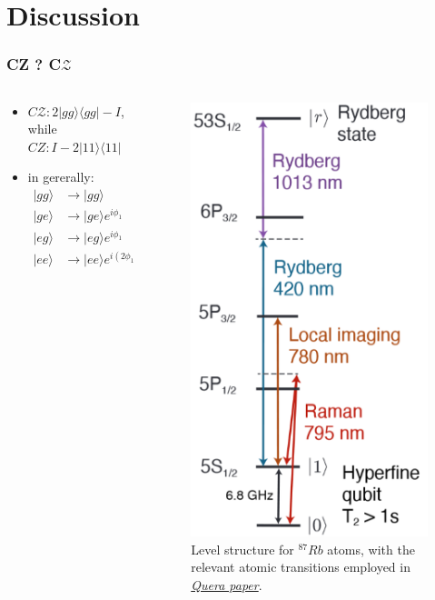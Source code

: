 \documentclass[18 pt]{beamer}
\begin{document}
\section{Discussion}
\begin{frame}
    \frametitle{CZ ? C$\mathcal{Z}$}
    \begin{columns}
        \begin{column}{.5\textwidth}
            \begin{itemize}
                \item $C\mathcal{Z}: 2|gg\rangle\langle gg| - I$, while $CZ: I - 2|11\rangle\langle 11|$
                \item in gererally:
                \begin{align*}
                    |gg\rangle & \rightarrow |gg\rangle \\
                    |ge\rangle & \rightarrow |ge\rangle e^{i\phi_1} \\
                    |eg\rangle & \rightarrow |eg\rangle e^{i\phi_1} \\
                    |ee\rangle & \rightarrow |ee\rangle e^{i(2\phi_1 + \pi)}
                \end{align*}
            \end{itemize}
        \end{column}
        \begin{column}{.5\textwidth}
            \begin{figure}
                \includegraphics[width=.5\textwidth]{level.png}
                \caption{Level structure for $^{87}Rb$ atoms, with the relevant atomic transitions employed in \href{http://arxiv.org/abs/2312.03982}{\textit{Quera paper}}.}
            \end{figure}
        \end{column}
    \end{columns}
\end{frame}
\end{document}
